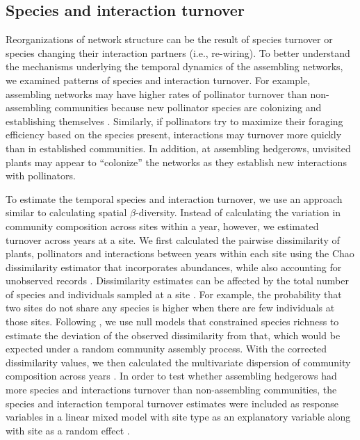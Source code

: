 \documentclass[12pt]{article}
\begin{document}
\subsection*{Species and interaction turnover}

Reorganizations of network structure can be the result of species
turnover or species changing their interaction partners (i.e.,
re-wiring). To better understand the mechanisms underlying the
temporal dynamics of the assembling networks, we examined patterns of
species and interaction turnover. For example, assembling networks may
have higher rates of pollinator turnover than non-assembling
communities because new pollinator species are colonizing and
establishing themselves \citep{mgonigle-2015-x}. Similarly, if
pollinators try to maximize their foraging efficiency based on the
species present, interactions may turnover more quickly than in
established communities. In addition, at assembling hedgerows,
unvisited plants may appear to ``colonize'' the networks as they
establish new interactions with pollinators.

To estimate the temporal species and interaction turnover, we use an
approach similar to calculating spatial $\beta$-diversity. Instead of
calculating the variation in community composition across sites within
a year, however, we estimated turnover across years at a site. We
first calculated the pairwise dissimilarity of plants, pollinators and
interactions between years within each site using the Chao
dissimilarity estimator that incorporates abundances, while also
accounting for unobserved records \citep{chao-2005-148}. Dissimilarity
estimates can be affected by the total number of species and
individuals sampled at a site \citep[e.g.,][]{ponisio2015farm}. For
example, the probability that two sites do not share any species is
higher when there are few individuals at those sites. Following
\cite{ponisio2015farm}, we use null models that constrained species
richness to estimate the deviation of the observed dissimilarity from
that, which would be expected under a random community assembly
process. With the corrected dissimilarity values, we then calculated
the multivariate dispersion of community composition across years
\citep{anderson-2011-19}. In order to test whether assembling
hedgerows had more species and interactions turnover than
non-assembling communities, the species and interaction temporal
turnover estimates were included as response variables in a linear
mixed model with site type as an explanatory variable along with site
as a random effect \citep{lme4, lmetest}.
\end{document}
